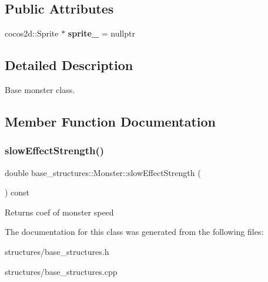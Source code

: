 \subsection*{Public Attributes}
\begin{DoxyCompactItemize}
\item 
\mbox{\label{classbase__structures_1_1Monster_a004eeb9f3eae244f105108a3479ab9a1}} 
cocos2d\+::\+Sprite $\ast$ {\bfseries sprite\+\_\+} = nullptr
\end{DoxyCompactItemize}


\subsection{Detailed Description}
Base monster class. 

\subsection{Member Function Documentation}
\mbox{\label{classbase__structures_1_1Monster_ad778a77546fd31bdb4125f7b150211c9}} 
\subsubsection{\texorpdfstring{slow\+Effect\+Strength()}{slowEffectStrength()}}
{\footnotesize\ttfamily double base\+\_\+structures\+::\+Monster\+::slow\+Effect\+Strength (\begin{DoxyParamCaption}{ }\end{DoxyParamCaption}) const}

\begin{DoxyReturn}{Returns}
coef of monster speed 
\end{DoxyReturn}


The documentation for this class was generated from the following files\+:\begin{DoxyCompactItemize}
\item 
structures/base\+\_\+structures.\+h\item 
structures/base\+\_\+structures.\+cpp\end{DoxyCompactItemize}
